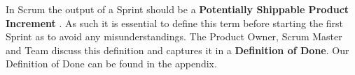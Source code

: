 In Scrum the output of a Sprint should be a \textbf{Potentially Shippable Product Increment} . As such it is essential to define this term before starting the first Sprint as to avoid any misunderstandings. The Product Owner, Scrum Master and Team discuss this definition and captures it in a \textbf{Definition of Done}.
Our Definition of Done can be found in the appendix.